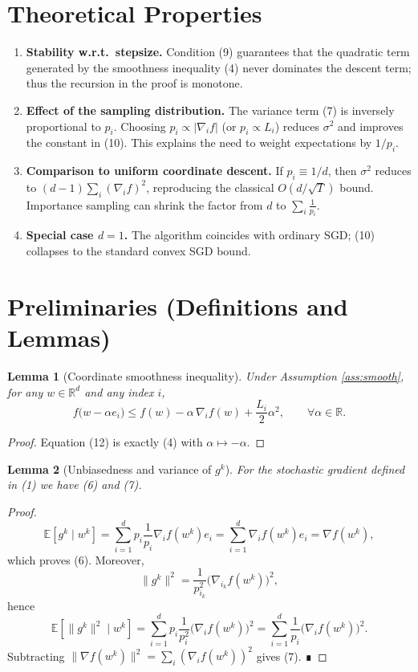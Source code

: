 \documentclass{article}
\newtheorem{lemma}{Lemma}
\begin{document}
\section*{Theoretical Properties}
\begin{enumerate}[label=\arabic*.]
\item \textbf{Stability w.r.t.\ stepsize.} Condition (9) guarantees that the quadratic term generated by the smoothness inequality (4) never dominates the descent term; thus the recursion in the proof is monotone.
\item \textbf{Effect of the sampling distribution.} The variance term (7) is inversely proportional to $p_i$. Choosing $p_i\propto |\nabla_i f|$ (or $p_i\propto L_i$) reduces $\sigma^{2}$ and improves the constant in (10). This explains the need to weight expectations by $1/p_i$.
\item \textbf{Comparison to uniform coordinate descent.} If $p_i\equiv 1/d$, then $\sigma^{2}$ reduces to $(d-1)\sum_i (\nabla_i f)^{2}$, reproducing the classical $O(d/\sqrt{T})$ bound. Importance sampling can shrink the factor from $d$ to $\sum_i\frac{1}{p_i}$.
\item \textbf{Special case $d=1$.} The algorithm coincides with ordinary SGD; (10) collapses to the standard convex SGD bound.
\end{enumerate}

\section*{Preliminaries (Definitions and Lemmas)}
\begin{lemma}[Coordinate smoothness inequality]\label{lem:smooth}
Under Assumption \ref{ass:smooth}, for any $w\in\mathbb{R}^{d}$ and any index $i$,
\[
f\bigl(w-\alpha e_i\bigr)
\le f(w)-\alpha\,\nabla_i f(w)+\frac{L_i}{2}\alpha^{2},
\qquad\forall\alpha\in\mathbb{R}.
\tag{12}
\]
\end{lemma}
\begin{proof}
Equation (12) is exactly (4) with $\alpha\mapsto -\alpha$.
\end{proof}

\begin{lemma}[Unbiasedness and variance of $g^{k}$]\label{lem:unbiased}
For the stochastic gradient defined in (1) we have (6) and (7).
\end{lemma}
\begin{proof}
\[
\mathbb{E}[g^{k}\mid w^{k}]
= \sum_{i=1}^{d}p_i\frac{1}{p_i}\nabla_i f(w^{k})e_i
= \sum_{i=1}^{d}\nabla_i f(w^{k})e_i
= \nabla f(w^{k}),
\]
which proves (6). Moreover,
\[
\|g^{k}\|^{2}
= \frac{1}{p_{i_k}^{2}}\bigl(\nabla_{i_k}f(w^{k})\bigr)^{2},
\]
hence
\[
\mathbb{E}\!\left[\|g^{k}\|^{2}\mid w^{k}\right]
= \sum_{i=1}^{d}p_i\frac{1}{p_i^{2}}\bigl(\nabla_i f(w^{k})\bigr)^{2}
= \sum_{i=1}^{d}\frac{1}{p_i}\bigl(\nabla_i f(w^{k})\bigr)^{2}.
\]
Subtracting $\|\nabla f(w^{k})\|^{2}= \sum_i (\nabla_i f(w^{k}))^{2}$ gives (7). ∎
\end{proof}
\end{document}
